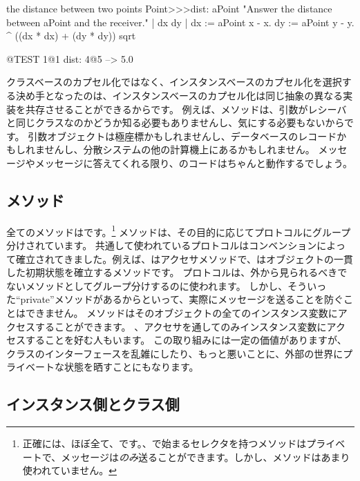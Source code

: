 \documentclass[a4paper,10pt,twoside]{book}
\begin{document}
\begin{method}[dist:]{the distance between two points}
Point>>>dist: aPoint 
	"Answer the distance between aPoint and the receiver."  
	| dx dy |
	dx := aPoint x - x.
	dy :=  aPoint y - y.
	^ ((dx * dx) + (dy * dy)) sqrt
\end{method}

\begin{code}{@TEST}
1@1 dist: 4@5 --> 5.0
\end{code}

クラスベースのカプセル化ではなく、インスタンスベースのカプセル化を選択する決め手となったのは、インスタンスベースのカプセル化は同じ抽象の異なる実装を共存させることができるからです。
例えば、メソッドは、引数がレシーバと同じクラスなのかどうか知る必要もありませんし、気にする必要もないからです。
引数オブジェクトは極座標かもしれませんし、データベースのレコードかもしれませんし、分散システムの他の計算機上にあるかもしれません。
メッセージやメッセージに答えてくれる限り、のコードはちゃんと動作するでしょう。

\subsection{メソッド}

全てのメソッドはです。\footnote{正確には、ほぼ全て、です。、で始まるセレクタを持つメソッドはプライベートで、メッセージは\emph{のみ}送ることができます。しかし、メソッドはあまり使われていません。}
メソッドは、その目的に応じてプロトコルにグループ分けされています。
共通して使われているプロトコルはコンベンションによって確立されてきました。例えば、はアクセサメソッドで、はオブジェクトの一貫した初期状態を確立するメソッドです。
プロトコルは、外から見られるべきでないメソッドとしてグループ分けするのに使われます。
しかし、そういった``private''メソッドがあるからといって、実際にメッセージを送ることを防ぐことはできません。
メソッドはそのオブジェクトの全てのインスタンス変数にアクセスすることができます。
、アクセサを通してのみインスタンス変数にアクセスすることを好む人もいます。
この取り組みには一定の価値がありますが、クラスのインターフェースを乱雑にしたり、もっと悪いことに、外部の世界にプライベートな状態を晒すことにもなります。

\subsection{インスタンス側とクラス側}
\end{document}
